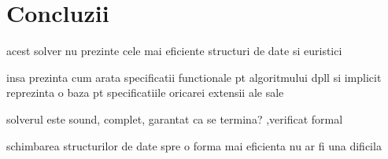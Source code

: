 \chapter*{Concluzii} 

acest solver nu prezinte cele mai eficiente structuri de date si euristici

insa prezinta cum arata specificatii functionale pt algoritmului dpll si implicit reprezinta o baza pt specificatiile oricarei extensii ale sale

solverul este sound, complet, garantat ca se termina? ,verificat formal

schimbarea structurilor de date spre o forma mai eficienta nu ar fi una dificila 